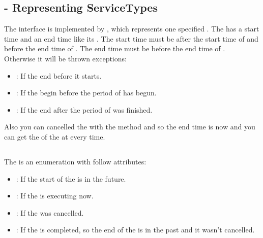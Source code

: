 \subsection{ - Representing ServiceTypes}
The interface  is implemented by , which represents one specified . The  has a 
start time and an end time like its . The start time must be after the start time of  and before the end time of 
. The end time must be before the end time of .\\
Otherwise it will be thrown exceptions:
\begin{itemize}
\item {}: If the  end before it starts.
\item {}: If the  begin before the period of  has begun.
\item {}: If the  end after the period of  was finished.
\end{itemize}
Also you can cancelled the  with the method  and so the end time is now and you can get the 
 of the  at every time.
  
\subsection{}
The  is an enumeration with follow attributes:
\begin{itemize}
\item {}: If the start of the  is in the future.
\item {}: If the  is executing now.
\item {}: If the  was cancelled.
\item {}: If the  is completed, so the end of the  is in the past and it wasn't cancelled.
\end{itemize}

